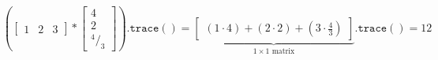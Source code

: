 \documentclass[preview]{standalone}
\begin{document}
\[ 
 \left(\left[\begin{smallmatrix}1 & 2 & 3\end{smallmatrix}\right] 
 \ast\left[\begin{smallmatrix}4\\ 2\\ ^4/_3 \end{smallmatrix}\right]\right)\mathtt{.trace()} 
 = 
 \underbrace{\left[\begin{smallmatrix}(1\cdot 4)+(2\cdot 2)+(3\cdot \frac{4}{3})\end{smallmatrix}\right]}_{ 
 1\times 1 \text{ matrix}}\mathtt{.trace()}=12 
 \] 
\end{document}
